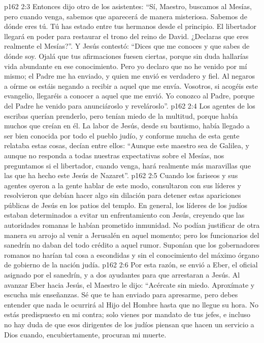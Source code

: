 \vs p162 2:3 Entonces dijo otro de los asistentes: “Sí, Maestro, buscamos al Mesías, pero cuando venga, sabemos que aparecerá de manera misteriosa. Sabemos de dónde eres tú. Tú has estado entre tus hermanos desde el principio. El libertador llegará en poder para restaurar el trono del reino de David. ¿Declaras que eres realmente el Mesías?”. Y Jesús contestó: “Dices que me conoces y que sabes de dónde soy. Ojalá que tus afirmaciones fuesen ciertas, porque sin duda hallarías vida abundante en ese conocimiento. Pero yo declaro que no he venido por mí mismo; el Padre me ha enviado, y quien me envió es verdadero y fiel. Al negaros a oírme os estáis negando a recibir a aquel que me envía. Vosotros, si acogéis este evangelio, llegaréis a conocer a aquel que me envió. Yo conozco al Padre, porque del Padre he venido para anunciároslo y revelároslo”.
\vs p162 2:4 Los agentes de los escribas querían prenderlo, pero tenían miedo de la multitud, porque había muchos que creían en él. La labor de Jesús, desde su bautismo, había llegado a ser bien conocida por todo el pueblo judío, y conforme mucha de esta gente relataba estas cosas, decían entre ellos: “Aunque este maestro sea de Galilea, y aunque no responda a todas nuestras expectativas sobre el Mesías, nos preguntamos si el libertador, cuando venga, hará realmente más maravillas que las que ha hecho este Jesús de Nazaret”.
\vs p162 2:5 Cuando los fariseos y sus agentes oyeron a la gente hablar de este modo, consultaron con sus líderes y resolvieron que debían hacer algo sin dilación para detener estas apariciones públicas de Jesús en los patios del templo. En general, los líderes de los judíos estaban determinados a evitar un enfrentamiento con Jesús, creyendo que las autoridades romanas le habían prometido inmunidad. No podían justificar de otra manera su arrojo al venir a Jerusalén en aquel momento; pero los funcionarios del sanedrín no daban del todo crédito a aquel rumor. Suponían que los gobernadores romanos no harían tal cosa a escondidas y sin el conocimiento del máximo órgano de gobierno de la nación judía.
\vs p162 2:6 Por esta razón, se envió a Eber, el oficial asignado por el sanedrín, y a dos ayudantes para que arrestaran a Jesús. Al avanzar Eber hacia Jesús, el Maestro le dijo: “Acércate sin miedo. Aproxímate y escucha mis enseñanzas. Sé que te han enviado para apresarme, pero debes entender que nada le ocurrirá al Hijo del Hombre hasta que no llegue su hora. No estás predispuesto en mi contra; solo vienes por mandato de tus jefes, e incluso no hay duda de que esos dirigentes de los judíos piensan que hacen un servicio a Dios cuando, encubiertamente, procuran mi muerte.
